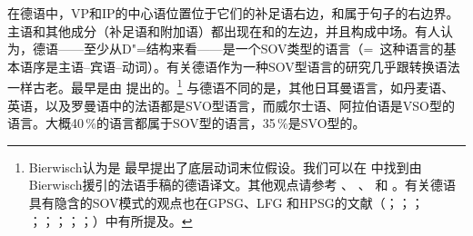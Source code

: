 在德语中，VP和IP的中心语位置位于它们的补足语右边，\vnullc 和\inullc 属于句子的右边界。主语和其他成分（补足语和附加语）都出现在\vnullc 和\inullc 的左边，并且构成中场。有人认为，德语——至少从D"=结构来看——是一个SOV类型的语言（=~这种语言的基本语序是主语--宾语--动词）。有关德语作为一种SOV型语言的研究几乎跟转换语法一样古老。最早是由 \citet*[]{Bierwisch63}提出的。\footnote{%
Bierwisch认为是 \citet{Fourquet57a}最早提出了底层动词末位假设。我们可以在 中找到由Bierwisch援引的法语手稿的德语译文。其他观点请参考 、 、 和 。有关德语具有隐含的SOV模式的观点也在GPSG\citep[]{Jacobs86a}、LFG \citep[\S~2.1.4]{Berman96a-u} 和HPSG的文献（\citealp*{KW91a}；\citealp{Oliva92a}；\citealp*{Netter92}；
\citealp*{Kiss93}；\citealp*{Frank94}；\citealp*{Kiss95a}；\citealp{Feldhaus97}；\citealp{Meurers2000b}；\citealp{Mueller2005c,MuellerGS}）中有所提及。
}
与德语不同的是，其他日耳曼语言，如丹麦语、英语，以及罗曼语中的法语都是SVO型语言，而威尔士语、阿拉伯语是VSO型的语言。大概40\,\%的语言都属于SOV型的语言，35\,\%是SVO型的\citep{wals-81}。


